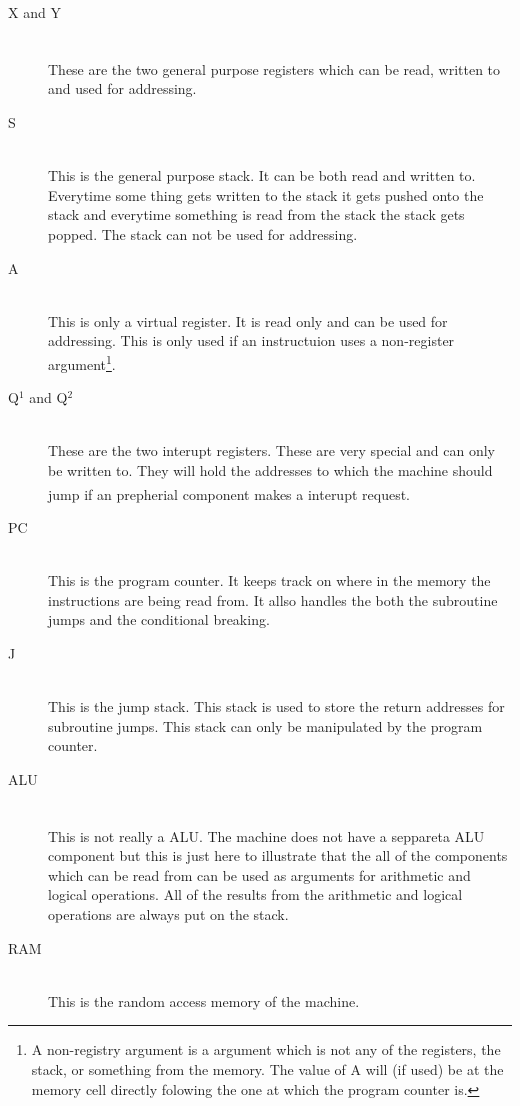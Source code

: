 \documentclass{article}
\begin{document}
\begin{description}
  \item[X and Y] \hfill \\
  These are the two general purpose registers\textsuperscript{\cite{register}}
  which can be read, written to and used for addressing.
  \item[S] \hfill \\
  This is the general purpose stack. It can be both read and
  written to. Everytime some thing gets written to the stack it gets pushed onto the
  stack and everytime something is read from the stack the stack gets popped.
  The stack can not be used for addressing.
  \item[A] \hfill \\
  This is only a virtual register. It is read only and can be used for
  addressing. This is only used if an instructuion uses a non-register
  argument\footnote{A non-registry argument is a argument which is not any of
  the registers, the stack, or something from the memory. The value of A will
  (if used) be at the memory cell directly folowing the one at which the
  program counter is.}.
  \item[Q$^1$ and Q$^2$] \hfill \\
  These are the two interupt registers. These are very special and can only be
  written to. They will hold the addresses to which the machine should jump if an
  prepherial component makes a interupt request\textsuperscript{\cite{irq}}.

  \item[PC]\hfill \\
  This is the program counter. It keeps track on where in the memory the
  instructions are being read from. It allso handles the both the subroutine
  jumps and the conditional breaking.
  \item[J]\hfill \\
  This is the jump stack. This stack is used to store the return addresses for
  subroutine jumps. This stack can only be manipulated by the program counter.
  \item[ALU]\hfill \\
  This is not really a ALU\textsuperscript{\cite{alu}}. The machine does not
  have a seppareta ALU component but this is just here to illustrate that the all of the components which can
  be read from can be used as arguments for arithmetic and logical operations.
  All of the results from the arithmetic and logical operations are always put
  on the stack.
  \item[RAM]\hfill \\
  This is the random access memory of the machine.
\end{description}
\end{document}
